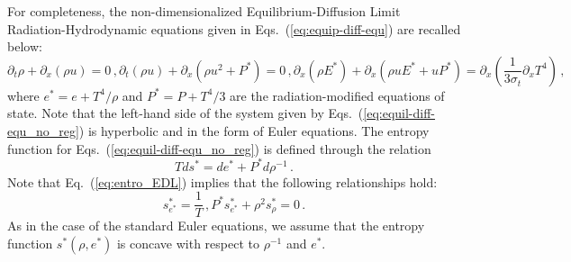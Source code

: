 \documentclass[review]{elsarticle}
\newcommand{\eqt}[1]{Eq.~(\ref{#1})}                     %
\newcommand{\eqts}[1]{Eqs.~(\ref{#1})}                     %
\newcommand{\tcr}[1]{\textcolor{red}{#1}}
\begin{document}
\begin{appendices}
For completeness, the non-dimensionalized Equilibrium-Diffusion Limit Radiation-Hydrodynamic equations given in \eqts{eq:equip-diff-equ} are recalled below:
%
\begin{subequations}
\label{eq:equil-diff-equ_no_reg}
%
\begin{equation}
\partial_t \rho + \partial_x \left( \rho u \right) = 0  \, ,
\end{equation}
%
\begin{equation}
\partial_t \left( \rho u \right) + \partial_x \left( \rho u^2 + P^* \right) = 0 \, , 
\end{equation}
%
\begin{equation}
\partial_x \left( \rho E^* \right) + \partial_x \left( \rho u E^* + u P^* \right) = \partial_x \left( \frac{1}{3 \sigma_t} \partial_x T^4 \right) \, ,
\end{equation}
%
\end{subequations}
%
where $e^* = e + T^4/\rho$ and $P^* = P + T^4/3$ are the radiation-modified equations of state. 
Note that the left-hand side of the system given by \eqts{eq:equil-diff-equ_no_reg} is hyperbolic 
and in the form of Euler equations. The entropy function for \eqts{eq:equil-diff-equ_no_reg} is defined 
through the relation
\begin{equation}
\label{eq:entro_EDL}
T d s^* = d e^* + P^* d \rho^{-1} \,.
\end{equation}
Note that \eqt{eq:entro_EDL} implies that the following relationships hold:
%
\begin{subequations}
\begin{equation}
s^*_{e^*} = \frac 1 T \,,
\end{equation}
\begin{equation} \label{eq:secondlawTD}
P^* s^*_{e^*} + \rho^2 s^*_{\rho} = 0 \,.
\end{equation}
\end{subequations}
As in the case of the standard Euler equations, we assume that the entropy function $s^*(\rho,e^*)$ is concave 
with respect to $\rho^{-1}$ and $e^*$.


\end{appendices}
\end{document}
